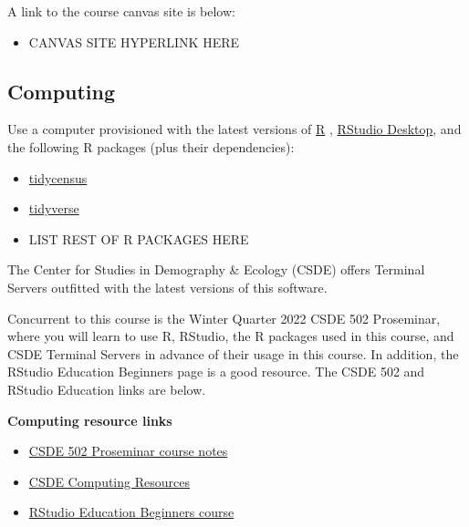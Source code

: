 \documentclass[
]{book}
\providecommand{\tightlist}{%
  \setlength{\itemsep}{0pt}\setlength{\parskip}{0pt}}
\begin{document}
A link to the course canvas site is below:

\begin{itemize}
\tightlist
\item
  CANVAS SITE HYPERLINK HERE
\end{itemize}

\hypertarget{computing}{%
\subsection*{Computing}\label{computing}}

Use a computer provisioned with the latest versions of \href{https://www.r-project.org/}{R} \citeyearpar{R-base}, \href{https://www.rstudio.com/products/rstudio/}{RStudio Desktop}, and the following R packages (plus their dependencies):

\begin{itemize}
\tightlist
\item
  \href{https://walker-data.com/tidycensus/}{tidycensus} \citeyearpar{R-tidycensus}
\item
  \href{https://www.tidyverse.org/}{tidyverse} \citeyearpar{tidyverse}
\item
  LIST REST OF R PACKAGES HERE
\end{itemize}

The Center for Studies in Demography \& Ecology (CSDE) offers Terminal Servers outfitted with the latest versions of this software.

Concurrent to this course is the Winter Quarter 2022 CSDE 502 Proseminar, where you will learn to use R, RStudio, the R packages used in this course, and CSDE Terminal Servers in advance of their usage in this course. In addition, the RStudio Education Beginners page is a good resource. The CSDE 502 and RStudio Education links are below.

\textbf{Computing resource links}

\begin{itemize}
\tightlist
\item
  \href{http://staff.washington.edu/phurvitz/csde502_winter_2021/week1.html}{CSDE 502 Proseminar course notes}
\item
  \href{https://csde.washington.edu/computing/resources/}{CSDE Computing Resources}
\item
  \href{https://education.rstudio.com/learn/beginner/}{RStudio Education Beginners course}
\end{itemize}
\end{document}
